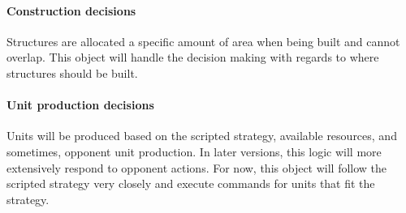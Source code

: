 \documentclass[10pt,letterpaper,onecolumn,draftclsnofoot]{IEEEtran}
\begin{document}
\paragraph{Construction decisions}
Structures are allocated a specific amount of area when being built and cannot overlap. This object will handle the decision making with regards to where structures should be built. 
\vspace{1mm}

\paragraph{Unit production decisions}
Units will be produced based on the scripted strategy, available resources, and sometimes, opponent unit production. In later versions, this logic will more extensively respond to opponent actions. For now, this object will follow the scripted strategy very closely and execute commands for units that fit the strategy.
\vspace{1mm}
\end{document}
